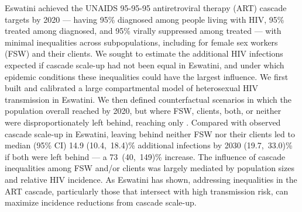 Eswatini achieved the UNAIDS 95-95-95 antiretroviral therapy (ART) cascade targets by 2020
--- having
95\% diagnosed among people living with HIV,
95\% treated among diagnosed, and
95\% virally suppressed among treated
---
with minimal inequalities across subpopulations,
including for female sex workers (FSW) and their clients.
We sought to estimate the additional HIV infections expected
if cascade scale-up had not been equal in Eswatini,
and under which epidemic conditions these inequalities could have the largest influence.
We first built and calibrated
a large compartmental model of heterosexual HIV transmission in Eswatini.
We then defined counterfactual scenarios in which
the population overall reached \casmd by 2020,
but where FSW, clients, both, or neither
were disproportionately left behind, reaching only \caslo.
Compared with observed cascade scale-up in Eswatini,
leaving behind neither FSW nor their clients led to median (95\% CI)
14.9 (10.4,~18.4)\% additional infections by 2030  (19.7,~33.0)\% if both were left behind %
--- a 73~(40,~149)\% increase. %
The influence of cascade inequalities among FSW and/or clients
was largely mediated by population sizes and relative HIV incidence.
As Eswatini has shown, addressing inequalities in the ART cascade,
particularly those that intersect with high transmission risk,
can maximize incidence reductions from cascade scale-up.
